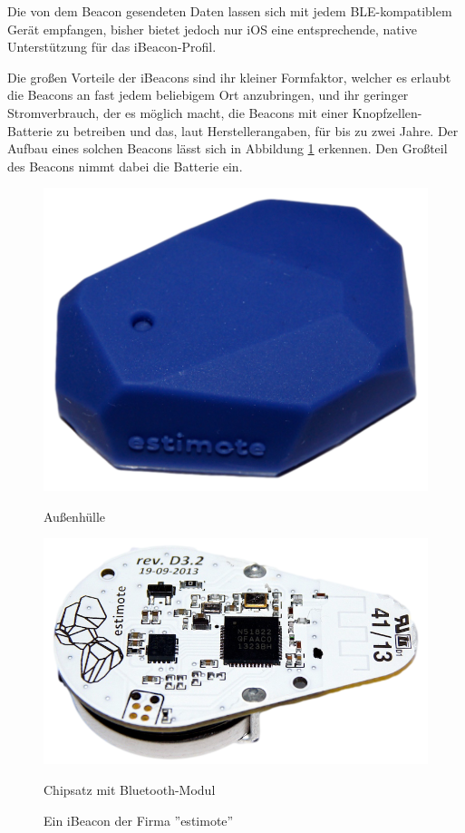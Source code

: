 Die von dem Beacon gesendeten Daten lassen sich mit jedem BLE-kompatiblem Gerät empfangen, bisher bietet jedoch nur iOS eine entsprechende, native Unterstützung für das iBeacon-Profil.

Die großen Vorteile der iBeacons sind ihr kleiner Formfaktor, welcher es erlaubt die Beacons an fast jedem beliebigem Ort anzubringen, und ihr geringer Stromverbrauch, der es möglich macht, die Beacons mit einer Knopfzellen-Batterie zu betreiben und das, laut Herstellerangaben, für bis zu zwei Jahre.
Der Aufbau eines solchen Beacons lässt sich in Abbildung \ref{estimote-beacon} erkennen. Den Großteil des Beacons nimmt dabei die Batterie ein. 


\begin{figure}[h!]
	\centering
	\begin{minipage}[t]{5cm}
		\includegraphics[scale=0.15]{pictures/estimote-beacon-outside}
		\caption{Außenhülle}
		\label{estimote-outside}
	\end{minipage}
	\hspace{2cm}
	\begin{minipage}[t]{5cm}
			\includegraphics[scale=0.2]{pictures/estimote-beacon-inside}
			\caption{Chipsatz mit Bluetooth-Modul}
			\label{estimote-inside}
	\end{minipage}
		\caption{Ein iBeacon der Firma ''estimote''}
		\label{estimote-beacon}
\end{figure}


